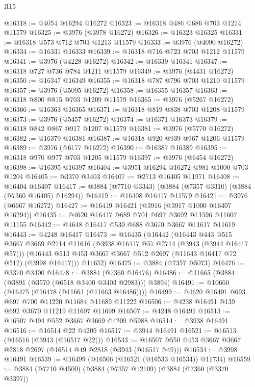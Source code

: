 \begin{lexlean}{R15}
\begin{coremodule}
@16318 := @4054 @16294 @16272
@16323 := @16318 @486 @686 @703 @1214 @11579
@16325 := @3976 (@3978 @16272)
@16326 := @16323 @16325
@16331 := @16318 @573 @712 @703 @1213 @11579
@16333 := @3976 (@4090 @16272)
@16334 := @16331 @16333
@16339 := @16318 @716 @723 @703 @1212 @11579
@16341 := @3976 (@4228 @16272)
@16342 := @16339 @16341
@16347 := @16318 @727 @736 @784 @1211 @11579
@16349 := @3976 (@4431 @16272)
@16350 := @16347 @16349
@16355 := @16318 @787 @796 @703 @1210 @11579
@16357 := @3976 (@5095 @16272)
@16358 := @16355 @16357
@16363 := @16318 @800 @815 @703 @1209 @11579
@16365 := @3976 (@5267 @16272)
@16366 := @16363 @16365
@16371 := @16318 @819 @838 @703 @1208 @11579
@16373 := @3976 (@5457 @16272)
@16374 := @16371 @16373
@16379 := @16318 @842 @867 @917 @1207 @11579
@16381 := @3976 (@5770 @16272)
@16382 := @16379 @16381
@16387 := @16318 @920 @939 @967 @1206 @11579
@16389 := @3976 (@6177 @16272)
@16390 := @16387 @16389
@16395 := @16318 @970 @977 @703 @1205 @11579
@16397 := @3976 (@6454 @16272)
@16398 := @16395 @16397
@16404 := @3951 @16294 @16272 @981 @1000 @703 @1204
@16405 := @3370 @3403
@16407 := @2713 @16405 @11971
@16408 := @16404 @16407
@16417 := @3884 (@7710 @3343) (@3884 (@7357 @3310) (@3884 (@7360 @16405) @16294))
@16419 := @16408 @16417 @11579
@16421 := @3976 (@6667 @16272)
@16427 := @16419 @16421 (@3916 (@3917 @1000 @16407 @16294))
@16435 := @4620 @16417 @689 @701 @697 @3692 @11596 @11607 @11155
@16442 := @4648 @16417 @530 @688 @3670 @3667 @11617 @11619
@16443 := @4248 @16417
@16473 := @16435
    (@16442
      (@16443
        @443
        @515
        @3667
        @3669
        @2714
        @11616
        (@3938 @16417 @57 @2714 (@3943 (@3944 @16417 @57)))
        (@16443 @513 @453 @3667 @3667 @512 @2697 (@11643 @16417 @72 @512) (@3998 @16417)))
      @11652)
@16475 := @3884 (@7357 @5073)
@16476 := @3370 @3400
@16478 := @3884 (@7360 @16476)
@16486 := @11665 (@3884 (@3891 (@3570 (@6518 @3400 @3403 @2983))) @3894)
@16491 := @10660 (@16475 (@16478 (@11661 (@11663 @16486))))
@16499 := @4620 @16491 @693 @697 @700 @11220 @11684 @11689 @11222
@16506 := @4238 @16491 @139 @692 @3670 @11219 @11697 @11699
@16507 := @4248 @16491
@16513 := @16507 @494 @552 @3667 @3669 @4209 @5988
@16514 := @3938 @16491
@16516 := @16514 @22 @4209
@16517 := @3944 @16491
@16521 := @16513 (@16516 (@3943 (@16517 @22)))
@16533 := @16507 @550 @453 @3667 @3667 @2818 @2697 (@16514 @49 @2818 (@3943 (@16517 @49)))
@16534 := @3998 @16491
@16539 := @16499 (@16506 (@16521 (@16533 @16534)) @11734)
@16559 := @3884
    (@7710 @4500)
    (@3884
      (@7357 @12109)
      (@3884
        (@7360 (@3370 @3397))

\end{coremodule}
\end{lexlean}
